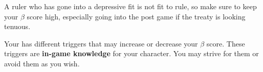 \documentclass[green]{NeptuneBall}
\begin{document}
A ruler who has gone into a depressive fit is not fit to rule, so make sure to keep your $\beta$ score high, especially going into the post game if the treaty is looking tenuous. 

Your \mDepression{\MYname} has different triggers that may increase or decrease your $\beta$ score. These triggers are \textbf{in-game knowledge} for your character. You may strive for them or avoid them as you wish.
\end{document}
